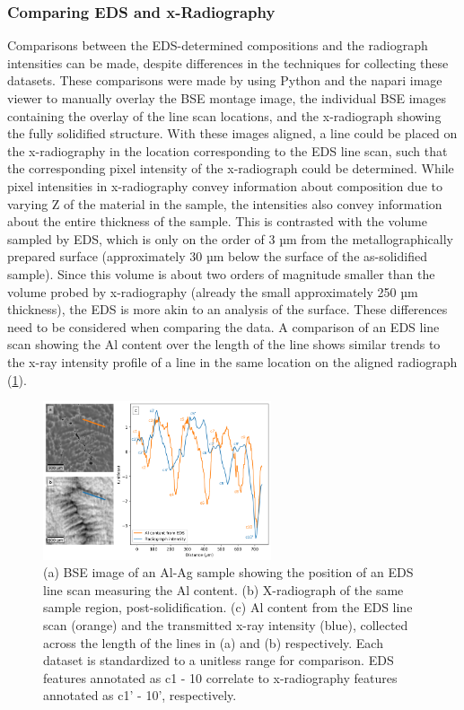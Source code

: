 \subsubsection{Comparing EDS and x-Radiography}
Comparisons between the EDS-determined compositions and the radiograph
intensities can be made, despite differences in the techniques for
collecting these datasets. These comparisons were made by using Python and
the napari image viewer to manually overlay the BSE montage image, the
individual BSE images containing the overlay of the line scan locations,
and the x-radiograph showing the fully solidified structure. With these
images aligned, a line could be placed on the x-radiography in the
location corresponding to the EDS line scan, such that the corresponding
pixel intensity of the x-radiograph could be determined. While pixel
intensities in x-radiography convey information about composition due to
varying Z of the material in the sample, the intensities also convey
information about the entire thickness of the sample. This is contrasted
with the volume sampled by EDS, which is only on the order of 3 µm from
the metallographically prepared surface (approximately 30 µm below the
surface of the as-solidified sample). Since this volume is about two orders
of magnitude smaller than the volume probed by x-radiography
(already the small approximately 250 µm thickness), the EDS is more akin to
an analysis of the surface. These differences need to be considered when
comparing the data. A comparison of an EDS line scan showing the Al content
over the length of the line shows similar trends to the x-ray intensity
profile of a line in the same location on the aligned radiograph
(\ref{fig/03/eds-vs-rad-1}).

\begin{figure}[ht]
    \centering
    \includegraphics[width=0.6\textwidth]{figures/03/05-eds-vs-rad-01-09.png}
    \caption{
        \small{}
        (a) BSE image of an Al-Ag sample showing the position of an EDS
        line scan measuring the Al content.
        (b) X-radiograph of the same sample region, post-solidification.
        (c) Al content from the EDS line scan (orange) and the transmitted
        x-ray intensity (blue), collected across the length of the lines in
        (a) and (b) respectively. Each dataset is standardized to a unitless
        range for comparison. EDS features annotated as c1 - 10 correlate to
        x-radiography features annotated as c1' - 10', respectively.
    }
    \label{fig/03/eds-vs-rad-1}
\end{figure}

